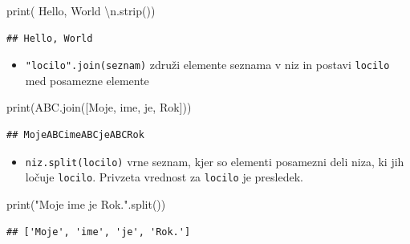 \documentclass[
]{report}
\newenvironment{Shaded}{\begin{snugshade}}{\end{snugshade}}
\newcommand{\BuiltInTok}[1]{#1}
\newcommand{\CharTok}[1]{\textcolor[rgb]{0.31,0.60,0.02}{#1}}
\newcommand{\NormalTok}[1]{#1}
\newcommand{\StringTok}[1]{\textcolor[rgb]{0.31,0.60,0.02}{#1}}
\providecommand{\tightlist}{%
  \setlength{\itemsep}{0pt}\setlength{\parskip}{0pt}}
\begin{document}
\begin{Shaded}
\begin{Highlighting}[]
\BuiltInTok{print}\NormalTok{(}\StringTok{\textquotesingle{}    Hello, World    }\CharTok{\textbackslash{}n}\StringTok{\textquotesingle{}}\NormalTok{.strip())}
\end{Highlighting}
\end{Shaded}

\begin{verbatim}
## Hello, World
\end{verbatim}

\begin{itemize}
\tightlist
\item
  \texttt{"locilo".join(seznam)} združi elemente seznama v niz in postavi \texttt{locilo}
  med posamezne elemente
\end{itemize}

\begin{Shaded}
\begin{Highlighting}[]
\BuiltInTok{print}\NormalTok{(}\StringTok{\textquotesingle{}ABC\textquotesingle{}}\NormalTok{.join([}\StringTok{\textquotesingle{}Moje\textquotesingle{}}\NormalTok{, }\StringTok{\textquotesingle{}ime\textquotesingle{}}\NormalTok{, }\StringTok{\textquotesingle{}je\textquotesingle{}}\NormalTok{, }\StringTok{\textquotesingle{}Rok\textquotesingle{}}\NormalTok{]))}
\end{Highlighting}
\end{Shaded}

\begin{verbatim}
## MojeABCimeABCjeABCRok
\end{verbatim}

\begin{itemize}
\tightlist
\item
  \texttt{niz.split(locilo)} vrne seznam, kjer so elementi posamezni deli niza, ki jih
  ločuje \texttt{locilo}. Privzeta vrednost za \texttt{locilo} je presledek.
\end{itemize}

\begin{Shaded}
\begin{Highlighting}[]
\BuiltInTok{print}\NormalTok{(}\StringTok{"Moje ime je Rok."}\NormalTok{.split())}
\end{Highlighting}
\end{Shaded}

\begin{verbatim}
## ['Moje', 'ime', 'je', 'Rok.']
\end{verbatim}
\end{document}
